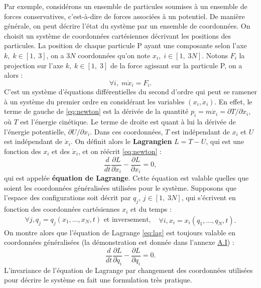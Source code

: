 Par exemple, considérons un ensemble de particules soumises à un ensemble de forces conservatives, c'est-à-dire de forces associées à un potentiel. De manière générale, on peut décrire l'état du système par un ensemble de coordonnées. On choisit un système de coordonnées cartésiennes décrivant les positions des particules. La position de chaque particule P ayant une composante selon l'axe $k,\;k\in[1,\;3]$, on a $3N$ coordonnées qu'on note $x_i,\; i\in[1,\;3N]$. Notons $F_i$ la projection sur l'axe $k,\;k\in[1,\;3]$ de la force agissant sur la particule P, on a alors :
\begin{equation}
\label{eq:newton}
\forall i,\;m\ddot{x}_i = F_i.
\end{equation}
C'est un système d'équations différentielles du second d'ordre qui peut se ramener à un système du premier ordre en considérant les variables $(x_i,\dot{x}_i)$. En effet, le terme de gauche de \ref{eq:newton} est la dérivée de la quantité
$p_i=m\dot{x}_i=\partial T/\partial\dot{x}_i$, où $T$ est l'énergie cinétique. Le terme de droite est quant à lui la dérivée de l'énergie potentielle, $\partial U/\partial x_i$. Dans ces coordonnées, $T$ est indépendant de $x_i$ et $U$ est indépendant de $\dot{x}_i$. On définit alors le \textbf{Lagrangien} $L=T-U$, qui est une fonction des $x_i$ et des $\dot{x}_i$, et on réécrit \ref{eq:newton} :
\begin{equation}
\label{eq:lag}
\frac{d}{dt}\frac{\partial L}{\partial \dot{x}_i}-\frac{\partial L}{\partial x_i}=0,
\end{equation}
qui est appelée \textbf{équation de Lagrange}. Cette équation est valable quelles que soient les coordonnées généralisées utilisées pour le système. Supposons que l'espace des configurations soit décrit par ${q_j}$, $j\in[1,\;3N]$, qui s'écrivent en fonction des coordonnées cartésiennes ${x_i}$ et du temps :
\begin{equation}
\begin{split}
\forall j, q_j=q_j(x_1,\ldots,x_N,t)\text{ et inversement, }
\end{split}
\begin{split}
\forall i, x_i=x_i(q_1,\ldots,q_N,t).
\end{split}
\end{equation}
On montre alors que l'équation de Lagrange \ref{eq:lag} est toujours valable en coordonnées généralisées (la démonstration est donnée dans l'annexe \hyperref[ann:lagrange]{A.I}) :
\begin{equation}
\label{eq:lagq}
\frac{d}{dt}\frac{\partial L}{\partial \dot{q}_i}-\frac{\partial L}{\partial q_i}=0.
\end{equation}
L'invariance de l'équation de Lagrange par changement des coordonnées utilisées pour décrire le système en fait une formulation très pratique.

